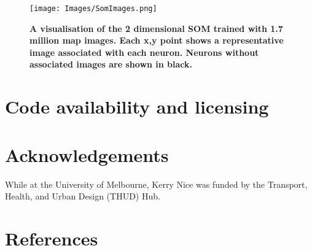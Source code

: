 \documentclass[final,3p,times,authoryear]{elsarticle}
\begin{document}
\begin{figure}[!htbp]
\centering    
\texttt{[image: Images/SomImages.png]}  
\caption{\bf A visualisation of the 2 dimensional SOM trained with 1.7 million map images. Each x,y point shows a representative image associated with each neuron. Neurons without associated images are shown in black. }    
 \label{fig:somresults}  
\end{figure} 


\section{Code availability and licensing}\label{sec:available}





\section*{Acknowledgements}
While at the University of Melbourne, Kerry Nice was funded by the Transport, Health, and Urban Design (THUD) Hub. 
 

\section*{References}\label{sec:ref}
   
  


\begin{thebibliography}{00}


\bibitem[ ()]{}

\end{thebibliography}
\end{document}

